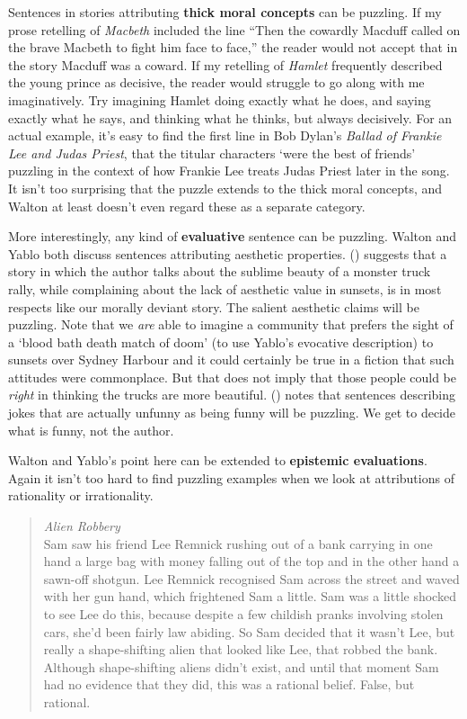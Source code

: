 \documentclass[
  11pt,
  letterpaper,
  DIV=11,
  numbers=noendperiod,
  twoside]{scrartcl}
\begin{document}
Sentences in stories attributing \textbf{thick moral concepts} can be
puzzling. If my prose retelling of \emph{Macbeth} included the line
``Then the cowardly Macduff called on the brave Macbeth to fight him
face to face,'' the reader would not accept that in the story Macduff
was a coward. If my retelling of \emph{Hamlet} frequently described the
young prince as decisive, the reader would struggle to go along with me
imaginatively. Try imagining Hamlet doing exactly what he does, and
saying exactly what he says, and thinking what he thinks, but always
decisively. For an actual example, it's easy to find the first line in
Bob Dylan's \emph{Ballad of Frankie Lee and Judas Priest}, that the
titular characters `were the best of friends' puzzling in the context of
how Frankie Lee treats Judas Priest later in the song. It isn't too
surprising that the puzzle extends to the thick moral concepts, and
Walton at least doesn't even regard these as a separate category.

More interestingly, any kind of \textbf{evaluative} sentence can be
puzzling. Walton and Yablo both discuss sentences attributing aesthetic
properties. () suggests that a
story in which the author talks about the sublime beauty of a monster
truck rally, while complaining about the lack of aesthetic value in
sunsets, is in most respects like our morally deviant story. The salient
aesthetic claims will be puzzling. Note that we \emph{are} able to
imagine a community that prefers the sight of a `blood bath death match
of doom' (to use Yablo's evocative description) to sunsets over Sydney
Harbour and it could certainly be true in a fiction that such attitudes
were commonplace. But that does not imply that those people could be
\emph{right} in thinking the trucks are more beautiful.
() notes that sentences
describing jokes that are actually unfunny as being funny will be
puzzling. We get to decide what is funny, not the author.

Walton and Yablo's point here can be extended to \textbf{epistemic
evaluations}. Again it isn't too hard to find puzzling examples when we
look at attributions of rationality or irrationality.

\begin{quote}
\emph{Alien Robbery}\\
Sam saw his friend Lee Remnick rushing out of a bank carrying in one
hand a large bag with money falling out of the top and in the other hand
a sawn-off shotgun. Lee Remnick recognised Sam across the street and
waved with her gun hand, which frightened Sam a little. Sam was a little
shocked to see Lee do this, because despite a few childish pranks
involving stolen cars, she'd been fairly law abiding. So Sam decided
that it wasn't Lee, but really a shape-shifting alien that looked like
Lee, that robbed the bank. Although shape-shifting aliens didn't exist,
and until that moment Sam had no evidence that they did, this was a
rational belief. False, but rational.
\end{quote}
\end{document}

